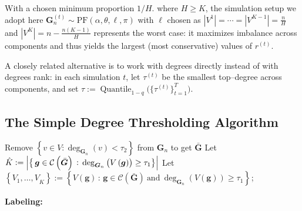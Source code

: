\documentclass[twoside,11pt]{article}
\theoremstyle{remark}
\begin{document}
\begin{remark}
With a chosen minimum proportion $1/H$. where $H\geq K$, the simulation setup we adopt here $\bm{G}_n^{(t)}\sim \mathrm{PF}(\alpha,\theta,\ell,\pi)$ with $\ell$ chosen as $|V^1|=\cdots=|V^{K-1}|=\frac{n}{H}$ and $|V^K|=n-\frac{n(K-1)}{H}$ represents the worst case: it maximizes imbalance across components and thus yields the largest (most conservative) values of $r^{(t)}$.
\end{remark}

\begin{remark}
A closely related alternative is to work with degrees directly instead of with degrees rank: in each simulation $t$, let  $\tau^{(t)}$ be the smallest top–degree across components, and set $\tau:= \operatorname{Quantile}_{1-q}\big(\{\tau^{(t)}\}_{t=1}^T\big)$.
\end{remark}



\subsection{The Simple Degree Thresholding Algorithm}
\label{secsec: The simple Two-Step Algorithm}
\begin{algorithm}[tbp]

\caption{Simple Forest Community Detection Method}
\label{alg: theory align}

Remove $\left\{v \in V: \deg_{\boldsymbol{G}_n}\left(v\right)<  \tau_2\right\}$ from $\bm{G}_n$ to get $\bar{\bm{G}}$\;
Let $\hat{K}:= \Bigl|\bigl\{\, \boldsymbol{g} \in \mathcal{C}\left(\bar{\bm G}\right)\,:\, \deg_{\bm{G}_n}\left(V\left(\boldsymbol{g}\right)\right)\ge \tau_1 \bigr\}\Bigr|$\;
Let $\left\{{V}_1,\dots,{V}_{\hat{K}}\right\}:=\left\{V\left(\bm{g}\right)\,:\, \boldsymbol{g} \in \mathcal{C}\left(\bar{\bm G}\right)\ \text{and}\ \deg_{\boldsymbol{G}_n}\left(V\left(\bm g\right)\right)\ge \tau_1\right\}_{}$;



\BlankLine
\textbf{Labeling:}

\end{algorithm}
\end{document}
